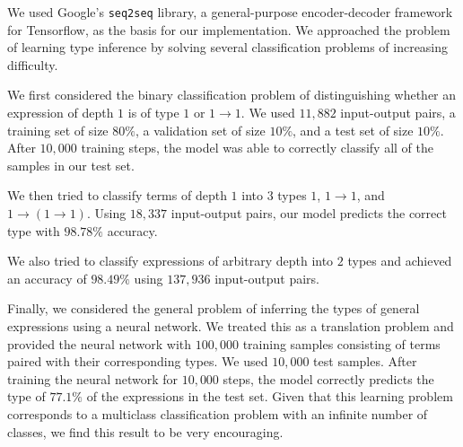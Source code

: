 \documentclass[twocolumn,9pt]{article}
\theoremstyle{definition}
\theoremstyle{remark}
\numberwithin{equation}{section}
\begin{document}
We used Google's \texttt{seq2seq} library, a general-purpose
encoder-decoder framework for Tensorflow, as the basis for our
implementation. We approached the problem of learning type inference by
solving several classification problems of increasing difficulty.

We first considered the binary classification problem of distinguishing
whether an expression of depth $1$ is of type $1$ or $1 \to 1$. We used
$11,882$ input-output pairs, a training set of size $80\%$, a validation
set of size $10\%$, and a test set of size $10\%$. After $10,000$
training steps, the model was able to correctly classify all of the
samples in our test set.

We then tried to classify terms of depth $1$ into $3$ types $1$, $1 \to
1$, and $1 \to (1 \to 1)$. Using $18,337$ input-output pairs, our model
predicts the correct type with $98.78\%$ accuracy.

We also tried to classify expressions of arbitrary depth into $2$ types
and achieved an accuracy of $98.49\%$ using $137,936$ input-output
pairs.

Finally, we considered the general problem of inferring the types of
general expressions using a neural network. We treated this as a
translation problem and provided the neural network with $100,000$
training samples consisting of terms paired with their corresponding
types. We used $10,000$ test samples. After training the neural network
for $10,000$ steps, the model correctly predicts the type of $77.1\%$ of
the expressions in the test set. Given that this learning problem
corresponds to a multiclass classification problem with an infinite
number of classes, we find this result to be very encouraging.



\end{document}

